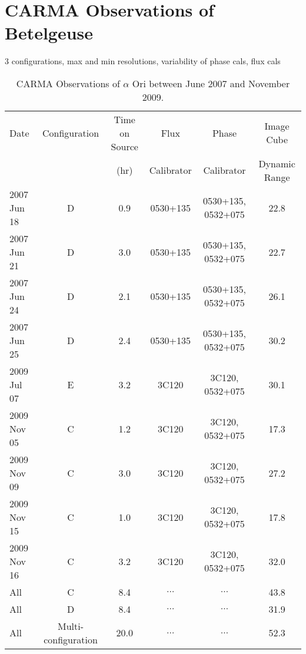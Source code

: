 \section{CARMA Observations of Betelgeuse}\label{sec:3.3}
3 configurations, max and min resolutions, variability of phase cals, flux cals
\begin{landscape}
\begin{table}
\begin{center}
\caption[CARMA Observations of $\alpha$ Ori.]
{CARMA Observations of $\alpha$ Ori between June 2007 and November 2009.}
\begin{tabular}{lccccc}
\hline
\hline
\rule{0pt}{2.5ex}Date & Configuration & Time on Source & Flux		& Phase 	& Image Cube \\
	 & 				 &  (hr)		  & Calibrator	& Calibrator& Dynamic Range \\
\hline
\rule{0pt}{2.5ex}2007 Jun 18 	& D & 0.9 & 0530+135	& 0530+135, 0532+075 	&  22.8 \\
2007 Jun 21 	& D & 3.0 & 0530+135	& 0530+135, 0532+075 	&  22.7 \\
2007 Jun 24 	& D & 2.1 & 0530+135	& 0530+135, 0532+075 	&  26.1 \\
2007 Jun 25 	& D & 2.4 & 0530+135	& 0530+135, 0532+075 	&  30.2 \\
2009 Jul 07	& E & 3.2 & 3C120 		& 3C120, 0532+075	& 30.1 \\
2009 Nov 05	& C & 1.2 & 3C120 		& 3C120, 0532+075 	& 17.3 \\
2009 Nov 09 	& C & 3.0 & 3C120 		& 3C120, 0532+075 	& 27.2 \\
2009 Nov 15	& C & 1.0 & 3C120 		& 3C120, 0532+075 	& 17.8 \\
2009 Nov 16	& C & 3.2 & 3C120 		& 3C120, 0532+075 	& 32.0  \\
All		& C & 8.4	&  $\dots$	& 	$\dots$	& 43.8 \\
All 		& D & 8.4 &  $\dots$	&  	$\dots$	& 31.9 \\
All 		& Multi-configuration & 20.0 & $\dots$& $\dots$ 	& 52.3 \\
\hline
\end{tabular}
\label{tab:1}
\end{center}
\end{table}
\end{landscape}

